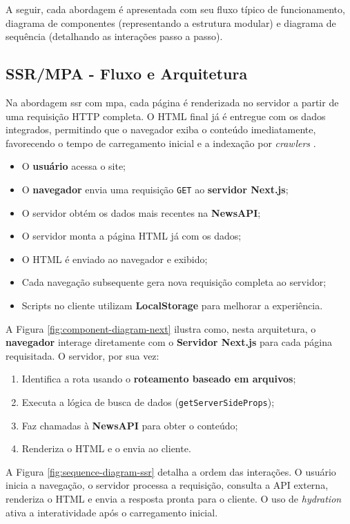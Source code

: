 A seguir, cada abordagem é apresentada com seu fluxo típico de funcionamento, diagrama de componentes (representando a estrutura modular) e diagrama de sequência (detalhando as interações passo a passo).

\subsection{SSR/MPA - Fluxo e Arquitetura}
\label{subsec:ssr-mpa}

Na abordagem \acrfull{ssr} com \acrfull{mpa}, cada página é renderizada no servidor a partir de uma requisição HTTP completa. O HTML final já é entregue com os dados integrados, permitindo que o navegador exiba o conteúdo imediatamente, favorecendo o tempo de carregamento inicial e a indexação por \textit{crawlers} \cite{atori2024}.

\begin{itemize}
  \item O \textbf{usuário} acessa o site;
  \item O \textbf{navegador} envia uma requisição \texttt{GET} ao \textbf{servidor Next.js};
  \item O servidor obtém os dados mais recentes na \textbf{NewsAPI};
  \item O servidor monta a página HTML já com os dados;
  \item O HTML é enviado ao navegador e exibido;
  \item Cada navegação subsequente gera nova requisição completa ao servidor;
  \item Scripts no cliente utilizam \textbf{LocalStorage} para melhorar a experiência.
\end{itemize}
  
A Figura \ref{fig:component-diagram-next} ilustra como, nesta arquitetura, o \textbf{navegador} interage diretamente com o \textbf{Servidor Next.js} para cada página requisitada. O servidor, por sua vez:
\begin{enumerate}
  \item Identifica a rota usando o \textbf{roteamento baseado em arquivos};
  \item Executa a lógica de busca de dados (\texttt{getServerSideProps});
  \item Faz chamadas à \textbf{NewsAPI} para obter o conteúdo;
  \item Renderiza o HTML e o envia ao cliente.
\end{enumerate}

A Figura \ref{fig:sequence-diagram-ssr} detalha a ordem das interações. O usuário inicia a navegação, o servidor processa a requisição, consulta a API externa, renderiza o HTML e envia a resposta pronta para o cliente. O uso de \textit{hydration} ativa a interatividade após o carregamento inicial.

